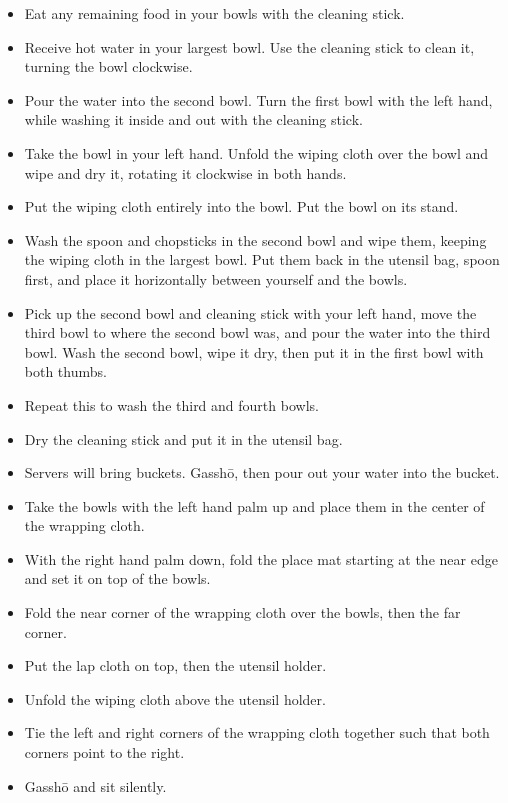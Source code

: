 \documentclass{article}
\begin{document}
\begin{multicols}{2}
\begin{itemize}
\item Eat any remaining food in your bowls with the cleaning stick.
\item Receive hot water in your largest bowl. Use the cleaning stick to
  clean it, turning the bowl clockwise.
\item Pour the water into the second bowl. Turn the first bowl with the
  left hand, while washing it inside and out with the cleaning stick.
\item Take the bowl in your left hand.
  Unfold the wiping cloth over the bowl and wipe and dry it, rotating
  it clockwise in both hands.
\item Put the wiping cloth entirely into the bowl. Put the bowl on its stand.
\item Wash the spoon and chopsticks in the second bowl and wipe them, keeping
  the wiping cloth in the largest bowl. Put them back in the utensil bag,
  spoon first, and place it horizontally between yourself and the bowls.
\item Pick up the second bowl and cleaning stick with your left hand, move
  the third bowl to where the second bowl was, and pour the water into
  the third bowl. Wash the second bowl, wipe it dry,
  then put it in the first bowl with both thumbs.
\item Repeat this to wash the third and fourth bowls.
\item Dry the cleaning stick and put it in the utensil bag.
\item Servers will bring buckets. Gassh\=o, then pour out your water into
  the bucket.
\item Take the bowls with the left hand palm up and place them in the
  center of the wrapping cloth.
\item With the right hand palm down, fold the place mat starting at the
  near edge and set it on top of the bowls.
\item Fold the near corner of the wrapping cloth over the bowls, then the
far corner.
\item Put the lap cloth on top, then the utensil holder.
\item Unfold the wiping cloth above the utensil holder.
\item Tie the left and right corners of the wrapping cloth together such
  that both corners point to the right.
\item Gassh\=o and sit silently.
\end{itemize}


\end{multicols}
\end{document}
